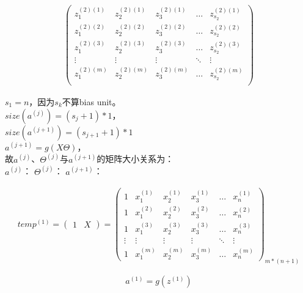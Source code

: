 \begin{equation}
\begin{aligned}
			\left(\begin{matrix}
				z_1^{(2)(1)} & z_2^{(2)(1)} & z_3^{(2)(1)} & \dots & z_{s_2}^{(2)(1)} \\
				z_1^{(2)(2)} & z_2^{(2)(2)} & z_3^{(2)(2)} & \dots & z_{s_2}^{(2)(2)} \\
				z_1^{(2)(3)} & z_2^{(2)(3)} & z_3^{(2)(3)} & \dots & z_{s_2}^{(2)(3)} \\
				\vdots & \vdots & \vdots & \ddots & \vdots \\
				z_1^{(2)(m)} & z_2^{(2)(m)} & z_3^{(2)(m)} & \dots & z_{s_2}^{(2)(m)} \\
			\end{matrix}\right)
\end{aligned}\end{equation}

$s_1 = n$，因为$s_k$不算bias unit。\\
$size(a^{(j)}) = (s_j+1)*1$，\\
$size(a^{(j+1)}) = (s_{j+1}+1)*1$\\ 
$a^{(j+1)} = g(X\Theta)$，\\
故$a^{(j)}$、$\Theta^{(j)}$与$a^{(j+1)}$的矩阵大小关系为：\\
$a^{(j)}$：
$\Theta^{(j)}$：
$a^{(j+1)}$：


\newpage

\begin{equation}\begin{aligned}
	temp^{(1)} = \left(\begin{matrix} 1 & X \end{matrix}\right)
	= \left( \begin{matrix}
			1 & x_1^{(1)} & x_2^{(1)} & x_3^{(1)} & \dots & x_n^{(1)} \\
			1 & x_1^{(2)} & x_2^{(2)} & x_3^{(2)} & \dots & x_n^{(2)} \\
			1 & x_1^{(3)} & x_2^{(3)} & x_3^{(3)} & \dots & x_n^{(3)} \\
			\vdots & \vdots    & \vdots    & \vdots    & \ddots & \vdots   \\
			1 & x_1^{(m)} & x_2^{(m)} & x_3^{(m)} & \dots & x_n^{(m)}
		\end{matrix}\right)_{m*(n+1)}
\end{aligned}\end{equation}


\begin{equation}
	a^{(1)} = g(z^{(1)})
\end{equation}

